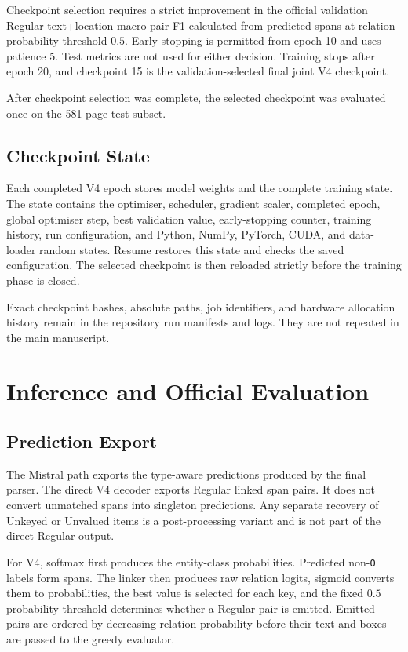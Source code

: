 Checkpoint selection requires a strict improvement in the official validation
Regular text+location macro pair F1 calculated from predicted spans at relation
probability threshold $0.5$. Early stopping is permitted from epoch 10 and uses
patience 5. Test metrics are not used for either decision. Training stops after
epoch 20, and checkpoint 15 is the validation-selected final joint V4
checkpoint.

After checkpoint selection was complete, the selected checkpoint was evaluated once on the 581-page test subset.

\subsection{Checkpoint State}
\label{sec:checkpointing}

Each completed V4 epoch stores model weights and the complete training state.
The state contains the optimiser, scheduler, gradient scaler, completed epoch,
global optimiser step, best validation value, early-stopping counter, training
history, run configuration, and Python, NumPy, PyTorch, CUDA, and data-loader
random states. Resume restores this state and checks the saved configuration.
The selected checkpoint is then reloaded strictly before the training phase is
closed.

Exact checkpoint hashes, absolute paths, job identifiers, and hardware
allocation history remain in the repository run manifests and logs. They are
not repeated in the main manuscript.

\section{Inference and Official Evaluation}
\label{sec:evaluation-protocol}

\subsection{Prediction Export}
\label{sec:baseline-eval-pipeline}

The Mistral path exports the type-aware predictions produced by the final
parser. The direct V4 decoder exports Regular linked span pairs. It does not
convert unmatched spans into singleton predictions. Any separate recovery of
Unkeyed or Unvalued items is a post-processing variant and is not part of the
direct Regular output.

For V4, softmax first produces the entity-class probabilities. Predicted
non-\texttt{O} labels form spans. The linker then produces raw relation logits,
sigmoid converts them to probabilities, the best value is selected for each
key, and the fixed $0.5$ probability threshold determines whether a Regular
pair is emitted. Emitted pairs are ordered by decreasing relation probability
before their text and boxes are passed to the greedy evaluator.


